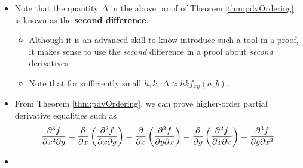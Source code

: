 \documentclass[../main.tex]{subfiles}
\begin{document}
\begin{itemize}
\begin{thm}
\begin{proof}
\begin{align*}
                f_{xy}(c_1,d_1) &= f_{xy}(a,b)+\epsilon_1&
                    f_{yx}(c_2,d_2) &= f_{yx}(a,b)+\epsilon_2
            \end{align*}
            where $\epsilon_1,\epsilon_2\to 0$ as $h,k\to 0$, we let $h,k\to 0$ and get
            \begin{equation*}
                f_{xy}(a,b) = f_{yx}(a,b)
            \end{equation*}
            as desired.
        \end{proof}
    \end{thm}
    \item Note that the quantity $\Delta$ in the above proof of Theorem \ref{thm:pdvOrdering} is known as the \textbf{second difference}.
    \begin{itemize}
        \item Although it is an advanced skill to know introduce such a tool in a proof, it makes sense to use the \emph{second} difference in a proof about \emph{second} derivatives.
        \item Note that for sufficiently small $h,k$, $\Delta\approx hkf_{xy}(a,b)$.
    \end{itemize}
    \item From Theorem \ref{thm:pdvOrdering}, we can prove higher-order partial derivative equalities such as
    \begin{equation*}
        \frac{\partial^3f}{\partial x^2\partial y} = \pdv{x}\left( \pdv{f}{x}{y} \right)
        = \pdv{x}\left( \pdv{f}{y}{x} \right)
        = \pdv{y}\left( \pdv{f}{x}{x} \right)
        = \frac{\partial^3f}{\partial y\partial x^2}
    \end{equation*}
    \item {}
\end{itemize}
\end{document}
